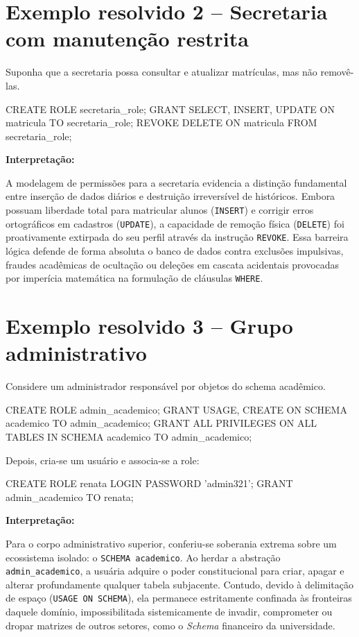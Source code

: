 \section{Exemplo resolvido 2 -- Secretaria com manutenção restrita}

Suponha que a secretaria possa consultar e atualizar matrículas, mas não removê-las.

\begin{sqlcode}
CREATE ROLE secretaria_role;
GRANT SELECT, INSERT, UPDATE ON matricula TO secretaria_role;
REVOKE DELETE ON matricula FROM secretaria_role;
\end{sqlcode}

\textbf{Interpretação:}

A modelagem de permissões para a secretaria evidencia a distinção fundamental entre inserção de dados diários e destruição irreversível de históricos. Embora possuam liberdade total para matricular alunos (\texttt{INSERT}) e corrigir erros ortográficos em cadastros (\texttt{UPDATE}), a capacidade de remoção física (\texttt{DELETE}) foi proativamente extirpada do seu perfil através da instrução \texttt{REVOKE}. Essa barreira lógica defende de forma absoluta o banco de dados contra exclusões impulsivas, fraudes acadêmicas de ocultação ou deleções em cascata acidentais provocadas por imperícia matemática na formulação de cláusulas \texttt{WHERE}.

\section{Exemplo resolvido 3 -- Grupo administrativo}

Considere um administrador responsável por objetos do schema acadêmico.

\begin{sqlcode}
CREATE ROLE admin_academico;
GRANT USAGE, CREATE ON SCHEMA academico TO admin_academico;
GRANT ALL PRIVILEGES ON ALL TABLES IN SCHEMA academico TO admin_academico;
\end{sqlcode}

Depois, cria-se um usuário e associa-se a role:

\begin{sqlcode}
CREATE ROLE renata LOGIN PASSWORD 'admin321';
GRANT admin_academico TO renata;
\end{sqlcode}

\textbf{Interpretação:}

Para o corpo administrativo superior, conferiu-se soberania extrema sobre um ecossistema isolado: o \texttt{SCHEMA academico}. Ao herdar a abstração \texttt{admin\_academico}, a usuária adquire o poder constitucional para criar, apagar e alterar profundamente qualquer tabela subjacente. Contudo, devido à delimitação de espaço (\texttt{USAGE ON SCHEMA}), ela permanece estritamente confinada às fronteiras daquele domínio, impossibilitada sistemicamente de invadir, comprometer ou dropar matrizes de outros setores, como o \textit{Schema} financeiro da universidade.


